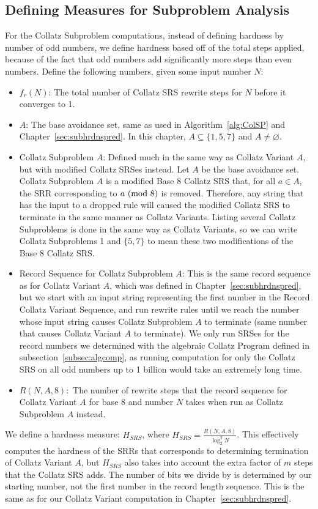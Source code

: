 \subsection{Defining Measures for Subproblem Analysis} \label{subsec:rewritemeasuredefs}
For the Collatz Subproblem computations, instead of defining hardness by number of odd numbers, we define hardness based off of the total steps applied, because of the fact that odd numbers add significantly more steps than even numbers. Define the following numbers, given some input number $N$:
\begin{itemize}
    \item $f_r(N)$: The total number of Collatz SRS rewrite steps for $N$ before it converges to 1.
    \item $A$: The base avoidance set, same as used in Algorithm~\ref{alg:ColSP} and Chapter~\ref{sec:subhrdnspred}. In this chapter, $A \subseteq \{1, 5, 7\}$ and $A \ne \varnothing$. 
    \item Collatz Subproblem $A$: Defined much in the same way as Collatz Variant $A$, but with modified Collatz SRSes instead. Let $A$ be the base avoidance set.  Collatz Subproblem $A$ is a modified Base 8 Collatz SRS that, for all $a \in A$, the SRR corresponding to $a \ (\mathrm{mod}\ 8)$ is removed. Therefore, any string that has the input to a dropped rule will caused the modified Collatz SRS to terminate in the same manner as Collatz Variants. Listing several Collatz Subproblems is done in the same way as Collatz Variants, so we can write Collatz Subproblems 1 and $\{5,7\}$ to mean these two modifications of the Base 8 Collatz SRS.
    \item Record Sequence for Collatz Subproblem $A$: This is the same record sequence as for Collatz Variant $A$, which was defined in Chapter~\ref{sec:subhrdnspred}, but we start with an input string representing the first number in the Record Collatz Variant Sequence, and run rewrite rules until we reach the number whose input string causes Collatz Subproblem $A$ to terminate (same number that causes Collatz Variant $A$ to terminate). We only run SRSes for the record numbers we determined with the algebraic Collatz Program defined in subsection~\ref{subsec:algcomp}, as running computation for only the Collatz SRS on all odd numbers up to 1 billion would take an extremely long time.
    \item $R(N, A, 8):$ The number of rewrite steps that the record sequence for Collatz Variant $A$ for base 8 and number $N$ takes when run as Collatz Subproblem $A$ instead.
\end{itemize}
We define a hardness measure: $H_{SRS}$, where $H_{SRS} = \frac{R(N, A, 8)}{\log_2^2{N}}$. This effectively computes the hardness of the SRRs that corresponds to determining termination of Collatz Variant $A$, but $H_{SRS}$ also takes into account the extra factor of $m$ steps that the Collatz SRS adds. The number of bits we divide by is determined by our starting number, not the first number in the record length sequence. This is the same as for our Collatz Variant computation in Chapter~\ref{sec:subhrdnspred}.

